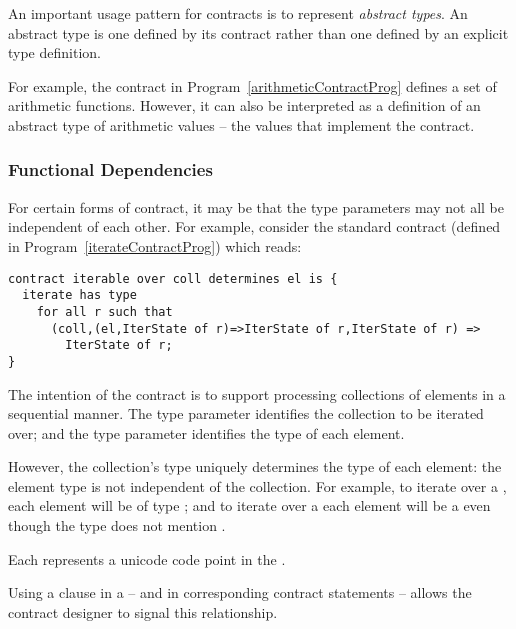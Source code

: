 \begin{aside}
An important usage pattern for contracts is to represent \emph{abstract types}. An abstract type is one defined by its contract rather than one defined by an explicit type definition.

For example, the  contract in Program~\vref{arithmeticContractProg} defines a set of arithmetic functions. However, it can also be interpreted as a definition of an abstract type of arithmetic values -- the values that implement the  contract.
\end{aside}

\subsubsection{Functional Dependencies}
\label{ContractFunctionalDependency}

For certain forms of contract, it may be that the type parameters may not all be independent of each other. For example, consider the standard  contract (defined in Program~\vref{iterateContractProg}) which reads:
\begin{lstlisting}
contract iterable over coll determines el is {
  iterate has type 
    for all r such that 
      (coll,(el,IterState of r)=>IterState of r,IterState of r) => 
        IterState of r;
}
\end{lstlisting}
The intention of the  contract is to support processing collections of elements in a sequential manner. The type parameter  identifies the collection to be iterated over; and the type parameter  identifies the type of each element.

However, the collection's type uniquely determines the type of each element: the element type is not independent of the collection. For example, to iterate over a , each element will be of type ; and to iterate over a  each element will be a  even though the  type does not mention .

\begin{aside}
Each  represents a unicode code point in the .
\end{aside}

Using a  clause in a  -- and in corresponding contract  statements -- allows the contract designer to signal this relationship.

